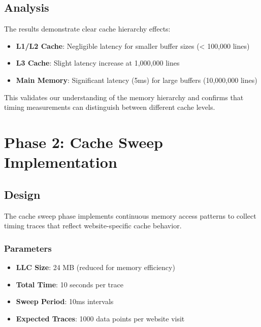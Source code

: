 \documentclass[11pt,a4paper]{article}
\begin{document}
\subsection{Analysis}
The results demonstrate clear cache hierarchy effects:
\begin{itemize}
    \item \textbf{L1/L2 Cache}: Negligible latency for smaller buffer sizes (< 100,000 lines)
    \item \textbf{L3 Cache}: Slight latency increase at 1,000,000 lines
    \item \textbf{Main Memory}: Significant latency (5ms) for large buffers (10,000,000 lines)
\end{itemize}

This validates our understanding of the memory hierarchy and confirms that timing measurements can distinguish between different cache levels.

\section{Phase 2: Cache Sweep Implementation}

\subsection{Design}
The cache sweep phase implements continuous memory access patterns to collect timing traces that reflect website-specific cache behavior.

\subsubsection{Parameters}
\begin{itemize}
    \item \textbf{LLC Size}: 24 MB (reduced for memory efficiency)
    \item \textbf{Total Time}: 10 seconds per trace
    \item \textbf{Sweep Period}: 10ms intervals
    \item \textbf{Expected Traces}: 1000 data points per website visit
\end{itemize}
\end{document}
